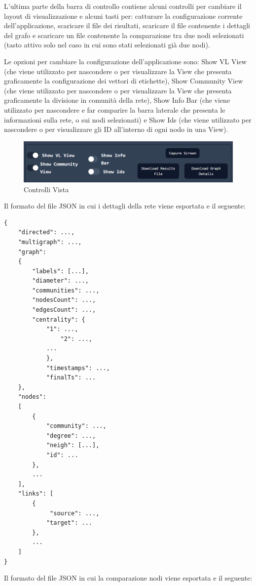 \documentclass[a4paper,12pt]{report}
\begin{document}
			L'ultima parte della barra di controllo contiene alcuni controlli per cambiare il layout di visualizzazione e alcuni tasti per: catturare la configurazione corrente dell'applicazione, scaricare il file dei risultati, scaricare il file contenente i dettagli del grafo e scaricare un file contenente la comparazione tra due nodi selezionati (tasto attivo solo nel caso in cui sono stati selezionati già due nodi). 

			Le opzioni per cambiare la configurazione dell'applicazione sono: Show VL View (che viene utilizzato per nascondere o per visualizzare la View che presenta graficamente la configurazione dei vettori di etichette), Show Community View (che viene utilizzato per nascondere o per visualizzare la View che presenta graficamente la divisione in comunità della rete), Show Info Bar (che viene utilizzato per nascondere e far comparire la barra laterale che presenta le informazioni sulla rete, o sui nodi selezionati) e Show Ids (che viene utilizzato per nascondere o per visualizzare gli ID all'interno di ogni nodo in una View). 

			\begin{center}
			\begin{figure}[H]
			\centering
			\includegraphics[width=0.9\linewidth,keepaspectratio]{viewcontrol}
			\caption{Controlli Vista}
			\end{figure}
			\end{center}

\pagebreak
			Il formato del file JSON in cui i dettagli della rete viene esportata e il seguente:
\begin{lstlisting}
{
	"directed": ...,
	"multigraph": ...,
	"graph": 
	{
		"labels": [...],
		"diameter": ...,
		"communities": ...,
		"nodesCount": ...,
		"edgesCount": ...,
		"centrality": {
			"1": ...,
      			"2": ...,
			...
    		},
    		"timestamps": ...,
    		"finalTs": ...
  	},
	"nodes": 
	[
		{
			"community": ..., 
			"degree": ..., 
			"neigh": [...], 
			"id": ...
		},
		...
  	],
	"links": [
		{
			 "source": ..., 
			"target": ...
		},
		...
	]
}

\end{lstlisting}

\pagebreak

			Il formato del file JSON in cui la comparazione nodi viene esportata e il seguente:
\end{document}
